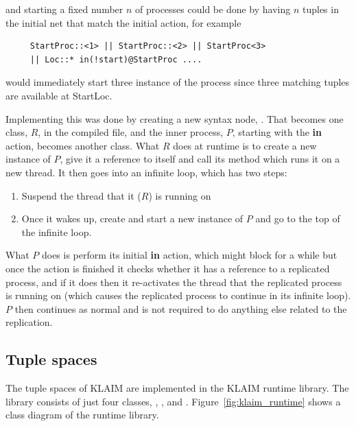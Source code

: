   and starting a fixed number $n$ of processes could be done by having $n$ 
  tuples in the initial net that match the initial action, for example

		\begin{verbatim}
     StartProc::<1> || StartProc::<2> || StartProc<3>
     || Loc::* in(!start)@StartProc ....
		\end{verbatim}
	
	would immediately start three instance of the process since three matching 
	tuples are available at \textsf{StartLoc}.

	Implementing this was done by creating a new syntax node, 
	. That becomes one class, $R$, in the compiled 
	file, and the inner process, $P$, starting with the \textbf{in} action, 
	becomes another class. What $R$ does at runtime is to create a new instance 
	of $P$, give it a reference to itself and call its  method
	which runs it on a new thread. It then goes into an infinite loop, which has 
	two steps:
	
	\begin{enumerate}
		\item Suspend the thread that it ($R$) is running on
		\item Once it wakes up, create and start a new instance of $P$ and go to 
		the top of the infinite loop.
	\end{enumerate}
	
	What $P$ does is perform its initial \textbf{in} action, which might block 
	for a while but once the action is finished it checks whether it has a 
	reference to a replicated process, and if it does then it re-activates the 
	thread that the replicated process is running on (which causes the 
	replicated process to continue in its infinite loop). $P$ then continues as 
	normal and is not required to do anything else related to the replication.
	
\subsection{Tuple spaces}

	The tuple spaces of KLAIM are implemented in the KLAIM runtime library. The 
	library consists of just four classes, , , 
	 and . Figure~\ref{fig:klaim_runtime} 
	shows a class diagram of the runtime library.


